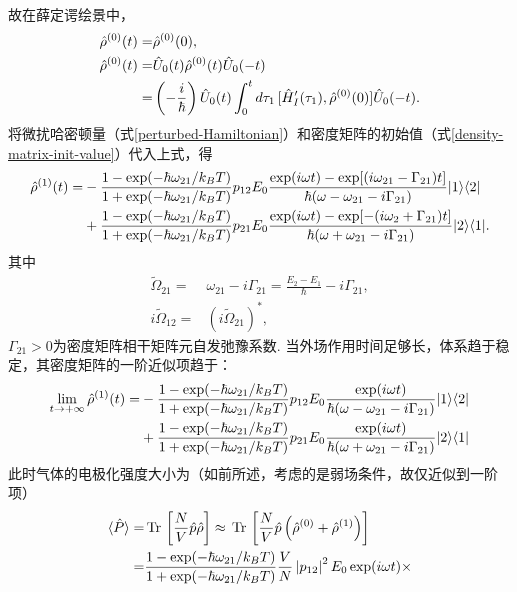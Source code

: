 \documentclass[a4paper, 10pt]{article}
\providecommand{\abs}[1]{\left\lvert#1\right\rvert} %
\providecommand{\tr}{\,\text{Tr}\,} %
\begin{document}
\begin{multicols*}{2}
\begin{align}
\end{align}
故在薛定谔绘景中，
\begin{align}
    \hat{\rho}^{(0)}(t)=&\hat{\rho}^{(0)}(0),\\
    \notag\hat{\rho}^{(0)}(t)=&\hat{U}_0(t)\hat{\rho}^{(0)}(t)\hat{U}_0(-t)\\
    =&\left(-\frac{i}{\hbar}\right)\hat{U}_0(t)\int_0^td\tau_1\,[\hat{H}_I'(\tau_1),\hat{\rho}^{(0)}(0)]\hat{U}_0(-t).
\end{align}
将微扰哈密顿量（式\eqref{perturbed-Hamiltonian}）和密度矩阵的初始值（式\eqref{density-matrix-init-value}）代入上式，得
\tiny
\begin{align}
    \notag\hat{\rho}^{(1)}(t)=&-\frac{1-\exp(-\hbar\omega_{21}/k_BT)}{1+\exp(-\hbar\omega_{21}/k_BT)}p_{12}E_0\frac{\exp(i\omega t)-\exp[(i\omega_{21}-\Gamma_{21})t]}{\hbar(\omega-\omega_{21}-i\Gamma_{21})}\lvert 1\rangle\langle 2\rvert\\
    &+\frac{1-\exp(-\hbar\omega_{21}/k_BT)}{1+\exp(-\hbar\omega_{21}/k_BT)}p_{21}E_0\frac{\exp(i\omega t)-\exp[-(i\omega_{2}+\Gamma_{21})t]}{\hbar(\omega+\omega_{21}-i\Gamma_{21})}\lvert 2\rangle\langle 1\rvert.
\end{align}
\normalsize
其中
\begin{align}
    \tilde{\Omega}_{21}=&\omega_{21}-i\Gamma_{21}=\frac{E_2-E_1}{\hbar}-i\Gamma_{21},\\
    i\tilde{\Omega}_{12}=&\left(i\tilde{\Omega}_{21}\right)^*,
\end{align}
$\Gamma_{21}>0$为密度矩阵相干矩阵元自发弛豫系数.
当外场作用时间足够长，体系趋于稳定，其密度矩阵的一阶近似项趋于：
\scriptsize
\begin{align}
    \notag\lim_{t\rightarrow+\infty}\hat{\rho}^{(1)}(t)=&-\frac{1-\exp(-\hbar\omega_{21}/k_BT)}{1+\exp(-\hbar\omega_{21}/k_BT)}p_{12}E_0\frac{\exp(i\omega t)}{\hbar(\omega-\omega_{21}-i\Gamma_{21})}\lvert 1\rangle\langle 2\rvert\\
    &+\frac{1-\exp(-\hbar\omega_{21}/k_BT)}{1+\exp(-\hbar\omega_{21}/k_BT)}p_{21}E_0\frac{\exp(i\omega t)}{\hbar(\omega+\omega_{21}-i\Gamma_{21})}\lvert 2\rangle\langle 1\rvert
\end{align}
\normalsize
此时气体的电极化强度大小为（如前所述，考虑的是弱场条件，故仅近似到一阶项）
\begin{align}
    \notag\langle\hat{P}\rangle=&\tr\left[\frac{N}{V}\hat{p}\hat{\rho}\right]\approx\tr\left[\frac{N}{V}\hat{p}\left(\hat{\rho}^{(0)}+\hat{\rho}^{(1)}\right)\right]\\
    \notag=&\frac{1-\exp(-\hbar\omega_{21}/k_BT)}{1+\exp(-\hbar\omega_{21}/k_BT)}\frac{V}{N}\abs{p_{12}}^2E_0\exp(i\omega t)\times\\

\end{align}
\end{multicols*}
\end{document}
